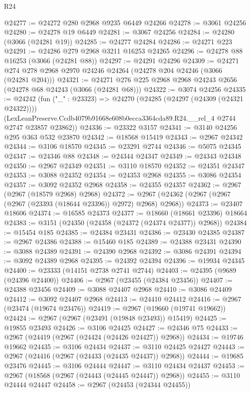 \begin{lexlean}{R24}
\begin{coremodule}
@24277 := @24272 @280 @2968 @9235 @6449 @24266
@24278 := @3061 @24256
@24280 := @24278 @19 @6449
@24281 := @3067 @24256
@24284 := @24280 (@3066 (@24281 @19))
@24285 := @24277 @24284
@24286 := @24271 @223
@24291 := @24286 @279 @2968 @3211 @16253 @24265
@24296 := @24278 @88 @16253 (@3066 (@24281 @88))
@24297 := @24291 @24296
@24309 := @24271 @274 @278 @2968 @2970 @24246 @24264 (@24278 @204 @24246 (@3066 (@24281 @204)))
@24321 := @24271 @276 @225 @2968 @2968 @24243 @2656 (@24278 @68 @24243 (@3066 (@24281 @68)))
@24322 := @3074 @24256
@24335 := @24242
    (fun ("_" : @23323) =>
    @24270
      (@24285 (@24297 (@24309 (@24321 @24322))))
      (LexLeanPreserve.Ccdb4079b91668e608b0ecca3364cda89.R24.__rel_4 @2744 @2747 @23857 @23862))
@24336 := @23322 @3157
@24341 := @3140 @24256 @295 @363 @532 @23870
@24342 := @18568 @15419
@24343 := @2967 @24342
@24344 := @3106 @18570
@24345 := @23291 @2744
@24346 := @5075 @24345
@24347 := @24346 @88
@24348 := @24344 @24347
@24349 := @24343 @24348
@24350 := @2967 @24349
@24351 := @3110 @18570
@24352 := @24351 @24347
@24353 := @3088 @24352
@24354 := @24353 @2968
@24355 := @3086 @24354
@24357 := @3092 @24352 @2968
@24358 := @24355 @24357
@24362 := @2967 (@2967 (@18579 @2968) @2968)
@24372 := @2967 (@24362 (@2967 (@2967 (@2967 (@23393 (@18644 @23396)) @2972) @2968) @2968))
@24373 := @23407 @18606
@24374 := @16585 @24373
@24377 := @18660 (@18661 @23396) @18664
@24383 := @3151 (@24350 (@24358 (@24372 (@24374 @24377)) @2968))
@24384 := @15454 @185
@24385 := @24384 @23431
@24386 := @23430 @24385
@24387 := @2967 @24386
@24388 := @15460 @185
@24389 := @24388 @23431
@24390 := @3088 @24389
@24391 := @24390 @2968
@24392 := @3086 @24391
@24394 := @3092 @24389 @2968
@24395 := @24392 @24394
@24396 := @19934 @24345
@24400 := @23333 (@14151 @2738 @2741 @2744)
@24403 := @24395 (@9689 (@24396 @24400))
@24406 := @2967 (@23455 (@24384 @23456))
@24407 := @24388 @23456
@24409 := @3088 @24407 @2968
@24410 := @3086 @24409
@24412 := @3092 @24407 @2968
@24413 := @24410 @24412
@24416 := @2967 (@23474 (@19674 @23476))
@24419 := @2967 (@19660 (@19741 @19662))
@24424 := @2967 (@2967 (@23491 (@19848 @23493)) @15419)
@24425 := @19855 @23493
@24426 := @3106 @24425
@24427 := @24346 @75
@24433 := @2967 (@24419 (@2967 (@24424 (@24426 @24427)) @2968))
@24434 := @19746 @19662
@24435 := @3106 @24434
@24437 := @3110 @24425 @24427
@24443 := @2967 (@24416 (@2967 (@24433 (@24435 @24437)) @2968))
@24444 := @19685 @23476
@24445 := @3106 @24444
@24447 := @3110 @24434 @24437
@24453 := @2967 (@18568 (@2967 (@24443 (@24445 @24447)) @2968))
@24455 := @3110 @24444 @24447
@24458 := @2967 (@24453 (@24344 @24455))

\end{coremodule}
\end{lexlean}
